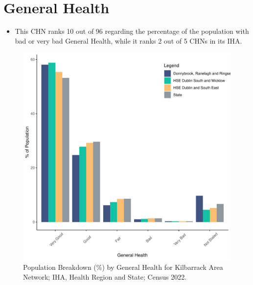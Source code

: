 \documentclass{article}
\begin{document}
\pagebreak

\section{General Health}\label{sect:GenHealth}
\begin{itemize}
\item  This CHN ranks  10 out of 96 regarding the percentage of the population with bad or very bad General Health, while it ranks   2 out of 5 CHNs in its IHA.
\end{itemize}
\begin{figure}[h]
	\centering
	\includegraphics[width = 150mm]{../figures/GenED.pdf}
	\caption{Population Breakdown (\%) by General Health for Kilbarrack Area Network; IHA, Health Region and State;  Census 2022.}
	\label{fig:2ae19629-1a6a-13a3-e055-000000000001}
	\end{figure}
\end{document}
